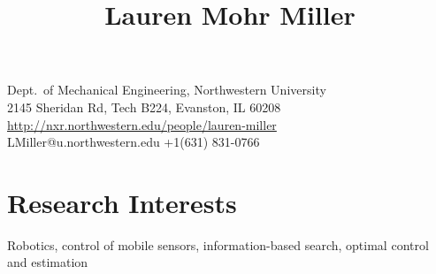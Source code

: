 \documentclass[10pt]{article}
\title{\vspace{-.5 in}\bfseries\huge Lauren Mohr Miller}
\date{}
\newcommand{\cvsect}[1]{
\vspace{-10  pt}
\section*{#1}
\vspace{-5 pt}
}
\begin{document}
\pagestyle{empty}
\maketitle
\thispagestyle{empty}



\vspace{-.75 in}
\begin{center}
{Dept.~of Mechanical Engineering, Northwestern University~\\ 
 2145 Sheridan Rd, Tech B224,  Evanston, IL 60208 \\
\small{ \url{http://nxr.northwestern.edu/people/lauren-miller}}\normalsize\\
 LMiller@u.northwestern.edu \hspace{30 pt} +1(631) 831-0766}
\end{center}
\vspace{-10  pt}



\cvsect{Research Interests} \hspace{20 pt} %
Robotics, control of mobile sensors, information-based search, optimal
control and estimation
\end{document}
